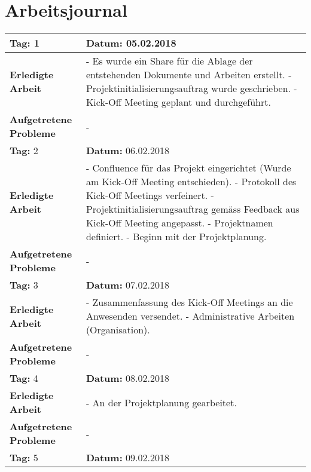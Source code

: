\section{Arbeitsjournal}
\begin{longtable}{|p{5cm}|p{5cm}p{6cm}|}
\hline
\rowcolor{heading}\textbf{Tag:} 1 & \textbf{Datum:} 05.02.2018 & \\ \hline
\textbf{Erledigte Arbeit} & \multicolumn{2}{p{11cm}|}{- Es wurde ein Share für die Ablage der entstehenden Dokumente und Arbeiten erstellt. \newline
- Projektinitialisierungsauftrag wurde geschrieben. \newline
- Kick-Off Meeting geplant und durchgeführt.} \\ \hline
\textbf{Aufgetretene Probleme} & \multicolumn{2}{p{11cm}|}{-} \\ \hline
\rowcolor{heading}\textbf{Tag:} 2 & \textbf{Datum:} 06.02.2018 & \\ \hline
\textbf{Erledigte Arbeit} & \multicolumn{2}{p{11cm}|}{- Confluence für das Projekt eingerichtet (Wurde am Kick-Off Meeting entschieden). \newline
- Protokoll des Kick-Off Meetings verfeinert. \newline
- Projektinitialisierungsauftrag gemäss Feedback aus Kick-Off Meeting angepasst. \newline
- Projektnamen definiert. \newline
- Beginn mit der Projektplanung.} \\ \hline
\textbf{Aufgetretene Probleme} & \multicolumn{2}{p{11cm}|}{-} \\ \hline
\rowcolor{heading}\textbf{Tag:} 3 & \textbf{Datum:} 07.02.2018 & \\ \hline
\textbf{Erledigte Arbeit} & \multicolumn{2}{p{11cm}|}{- Zusammenfassung des Kick-Off Meetings an die Anwesenden versendet. \newline
- Administrative Arbeiten (Organisation).} \\ \hline
\textbf{Aufgetretene Probleme} & \multicolumn{2}{p{11cm}|}{-} \\ \hline
\rowcolor{heading}\textbf{Tag:} 4 & \textbf{Datum:} 08.02.2018 & \\ \hline
\textbf{Erledigte Arbeit} & \multicolumn{2}{p{11cm}|}{- An der Projektplanung gearbeitet.} \\ \hline
\textbf{Aufgetretene Probleme} & \multicolumn{2}{p{11cm}|}{-} \\ \hline
\rowcolor{heading}\textbf{Tag:} 5 & \textbf{Datum:} 09.02.2018 & \\ \hline

\end{longtable}
